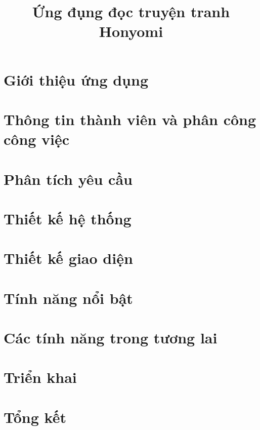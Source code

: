 \documentclass[12pt, a4paper]{article}
\title{Ứng đụng đọc truyện tranh Honyomi}
\begin{document}

\clearpage

\tableofcontents
\clearpage




% 
\section{Giới thiệu ứng dụng}


\section{Thông tin thành viên và phân công công việc}


\section{Phân tích yêu cầu}


\section{Thiết kế hệ thống}


\section{Thiết kế giao diện}


\section{Tính năng nổi bật}


\section{Các tính năng trong tương lai}


\section{Triển khai}


\section{Tổng kết}


\citation{}

\end{document}
